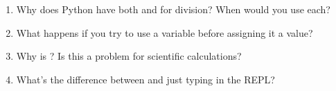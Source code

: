 \begin{ponder}
\begin{enumerate}
    \item Why does Python have both \py{/} and \py{//} for division? When would you use each?
    \item What happens if you try to use a variable before assigning it a value?
    \item Why is ? Is this a problem for scientific calculations?
    \item What's the difference between  and just typing  in the REPL?
\end{enumerate}
\end{ponder}
